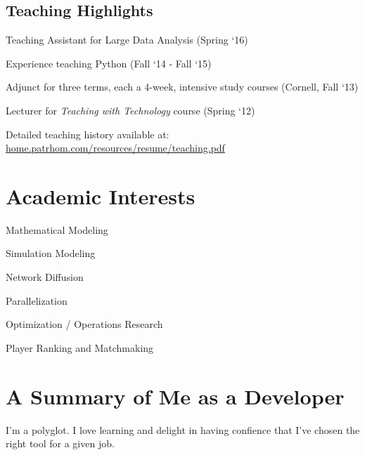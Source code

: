 \documentclass[10pt,letterpaper]{article}
\renewenvironment{itemize}{
  \begin{list}{}{
    \setlength{\leftmargin}{1.5em}
    \setlength{\itemsep}{0.25em}
    \setlength{\parskip}{0pt}
    \setlength{\parsep}{0.25em}
  }
}{
  \end{list}
}
\begin{document}
\subsection*{Teaching Highlights}
\begin{itemize}
  \item Teaching Assistant for Large Data Analysis (Spring `16)
  \item Experience teaching Python (Fall `14 - Fall `15)
  \item Adjunct for three terms, each a 4-week, intensive study courses (Cornell, Fall `13)
  \item Lecturer for {\em Teaching with Technology} course (Spring `12)
  \item Detailed teaching history available at: \\
   \phantom{quad} \url{home.patrhom.com/resources/resume/teaching.pdf}
\end{itemize}


\section*{Academic Interests}
\begin{itemize}
  \item Mathematical Modeling
  \item Simulation Modeling
  \item Network Diffusion
  \item Parallelization
  \item Optimization / Operations Research
  \item Player Ranking and Matchmaking
\end{itemize}

\newpage

\section*{A Summary of Me as a Developer}

I'm a polyglot.  I love learning and delight in having confience that I've chosen the right tool for a given job.
\end{document}
